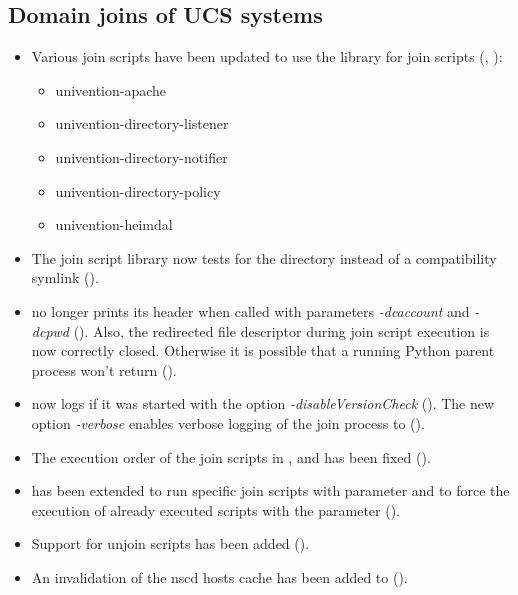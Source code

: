 \subsection{Domain joins of UCS systems}
\begin{itemize}


\item Various join scripts have been updated to use the library for
  join scripts (, ):
  \begin{itemize}
    \item univention-apache
    \item univention-directory-listener
    \item univention-directory-notifier
    \item univention-directory-policy
    \item univention-heimdal
  \end{itemize}

\item The join script library now tests for the directory
   instead of a compatibility
  symlink ().

\item {} no longer prints its header when
 called with parameters \emph{-dcaccount} and \emph{-dcpwd}
 (). Also, the redirected file descriptor during join
 script execution is now correctly closed. Otherwise it is possible
  that a running Python parent process won't return ().

\item {} now logs if it was started with the
option \emph{-disableVersionCheck} (). The new option
\emph{-verbose} enables verbose logging of the join process to
 ().

\item The execution order of the join scripts in
,  and
 has been fixed ().

\item {} has been extended to run
specific join scripts with parameter  and to force
the execution of already executed scripts with the parameter
 ().

\item Support for unjoin scripts has been added ().

\item An invalidation of the nscd hosts cache has been added to
 ().

\end{itemize}


